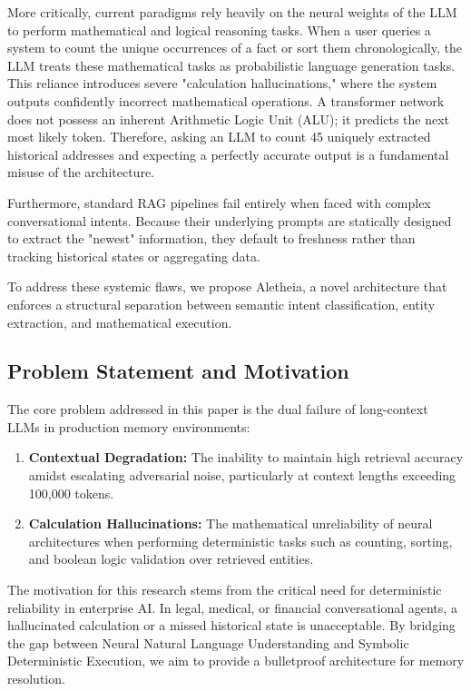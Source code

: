 \documentclass[journal,10pt]{IEEEtran}
\begin{document}
More critically, current paradigms rely heavily on the neural weights of the LLM to perform mathematical and logical reasoning tasks. When a user queries a system to count the unique occurrences of a fact or sort them chronologically, the LLM treats these mathematical tasks as probabilistic language generation tasks. This reliance introduces severe "calculation hallucinations," where the system outputs confidently incorrect mathematical operations. A transformer network does not possess an inherent Arithmetic Logic Unit (ALU); it predicts the next most likely token. Therefore, asking an LLM to count 45 uniquely extracted historical addresses and expecting a perfectly accurate output is a fundamental misuse of the architecture.

Furthermore, standard RAG pipelines fail entirely when faced with complex conversational intents. Because their underlying prompts are statically designed to extract the "newest" information, they default to freshness rather than tracking historical states or aggregating data. 

To address these systemic flaws, we propose Aletheia, a novel architecture that enforces a structural separation between semantic intent classification, entity extraction, and mathematical execution. 

\subsection{Problem Statement and Motivation}
The core problem addressed in this paper is the dual failure of long-context LLMs in production memory environments:
\begin{enumerate}
    \item \textbf{Contextual Degradation:} The inability to maintain high retrieval accuracy amidst escalating adversarial noise, particularly at context lengths exceeding 100,000 tokens.
    \item \textbf{Calculation Hallucinations:} The mathematical unreliability of neural architectures when performing deterministic tasks such as counting, sorting, and boolean logic validation over retrieved entities.
\end{enumerate}
The motivation for this research stems from the critical need for deterministic reliability in enterprise AI. In legal, medical, or financial conversational agents, a hallucinated calculation or a missed historical state is unacceptable. By bridging the gap between Neural Natural Language Understanding and Symbolic Deterministic Execution, we aim to provide a bulletproof architecture for memory resolution.
\end{document}
